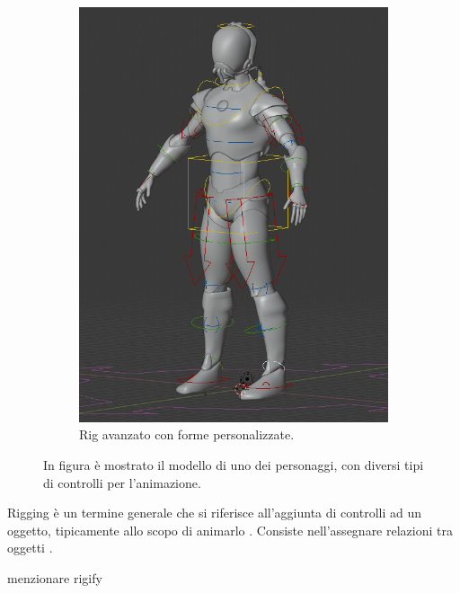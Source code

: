 \begin{figure}
\begin{subfigure}{.33\textwidth}
  \includegraphics[width=\linewidth]{Figures/rig2}
  \caption{Rig avanzato con forme personalizzate.}
  \label{fig:rig2}
\end{subfigure}
\decoRule
\caption[Rig a confronto]{In figura è mostrato il modello di uno dei personaggi, con diversi tipi di controlli per l'animazione.}
\label{fig:rig}
\end{figure}

Rigging è un termine generale che si riferisce all'aggiunta di controlli ad un oggetto, tipicamente allo scopo di animarlo \parencite{blendDoc}.
Consiste nell'assegnare relazioni tra oggetti \parencite{BlendTut}.

menzionare rigify

